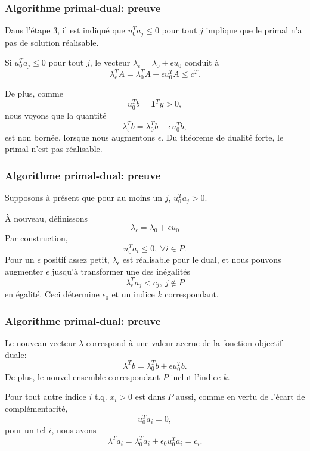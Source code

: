 \documentclass[t,usepdftitle=false]{beamer}
\def\bone{\boldsymbol{1}}
\begin{document}
\begin{frame}
\frametitle{Algorithme primal-dual: preuve}

Dans l'étape 3, il est indiqué que $u_0^T a_j \leq 0$ pour tout $j$ implique que le primal n'a pas de solution réalisable.

\mbox{}

Si $u_0^T a_j \leq 0$ pour tout $j$, le vecteur
$\lambda_{\epsilon} = \lambda_0 + \epsilon u_0$ conduit à
\[
\lambda_{\epsilon}^TA = \lambda_0^TA + \epsilon u_0^TA \leq c^T.
\]

\mbox{}

De plus, comme
\[
u_0^T b = \bone^T y > 0,
\]
nous voyons que la quantité
\[
\lambda_{\epsilon}^Tb = \lambda_0^Tb + \epsilon u_0^T b,
\]
est non bornée, lorsque nous augmentons $\epsilon$.
Du théoreme de dualité forte, le primal n'est pas réalisable.

\end{frame}

\begin{frame}
\frametitle{Algorithme primal-dual: preuve}

Supposons à présent que pour au moins un $j$, $u_0^T a_j > 0$.

\mbox{}

À nouveau, définissons
\[
\lambda_{\epsilon} = \lambda_0 + \epsilon u_0
\]
Par construction,
\[
u_0^T a_i \leq 0, \ \forall i \in P.
\]
Pour un $\epsilon$ positif assez petit, $\lambda_{\epsilon}$ est réalisable pour le dual, et nous pouvons augmenter $\epsilon$ jusqu'à transformer une des inégalités
\[
\lambda_{\epsilon}^T a_j < c_j,\ j \notin P
\]
en égalité.
Ceci détermine $\epsilon_0$ et un indice $k$ correspondant.

\end{frame}

\begin{frame}
\frametitle{Algorithme primal-dual: preuve}

Le nouveau vecteur $\lambda$ correspond à une valeur accrue de la fonction objectif duale:
\[
\lambda^T b = \lambda_0^T b + \epsilon u_0^T b.
\]
De plus, le nouvel ensemble correspondant $P$ inclut l'indice $k$.

\mbox{}

Pour tout autre indice $i$ t.q. $x_i > 0$ est dans $P$ aussi, comme en vertu de l'écart de complémentarité,
\[
u_0^T a_i = 0,
\]
pour un tel $i$, nous avons
\[
\lambda^T a_i = \lambda_0^T a_i + \epsilon_0 u_0^T a_i = c_i.
\]

\end{frame}
\end{document}
